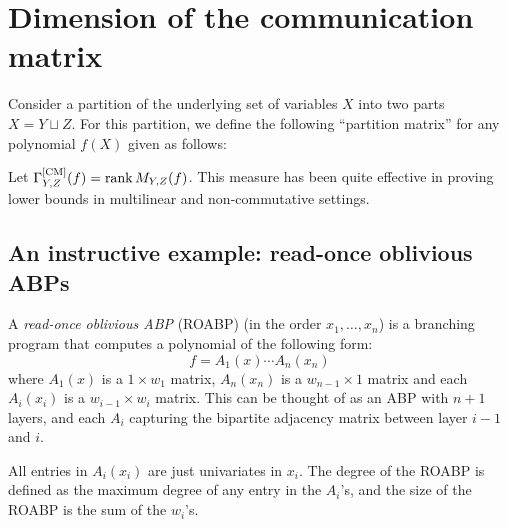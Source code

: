 \section{Dimension of the communication matrix}

Consider a partition of the underlying set of variables $X$ into two parts $X = Y \sqcup Z$. For this partition, we define the following ``partition matrix'' for any polynomial $f(X)$ given as follows:


Let $\Gamma^{\mathrm{[CM]}}_{Y,Z}(f) = \operatorname{rank} M_{Y,Z}(f)$. This measure has been quite effective in proving lower bounds in multilinear and non-commutative settings. 

\subsection{An instructive example: read-once oblivious ABPs}

A \emph{read-once oblivious ABP} (ROABP) (in the order $x_1,\ldots, x_n$) is a branching program that computes a polynomial of the following form:
\[
f = A_1(x) \cdots A_n(x_n)
\]
where $A_1(x)$ is a $1 \times w_1$ matrix, $A_n(x_n)$ is a $w_{n-1} \times 1$ matrix and each $A_i(x_i)$ is a $w_{i-1} \times w_i$ matrix. This can be thought of as an ABP with $n+1$ layers, and each $A_i$ capturing the bipartite adjacency matrix between layer $i-1$ and $i$. 

All entries in $A_i(x_i)$ are just univariates in $x_i$. The degree of the ROABP is defined as the maximum degree of any entry in the $A_i$'s, and the size of the ROABP is the sum of the $w_i$'s. \\

